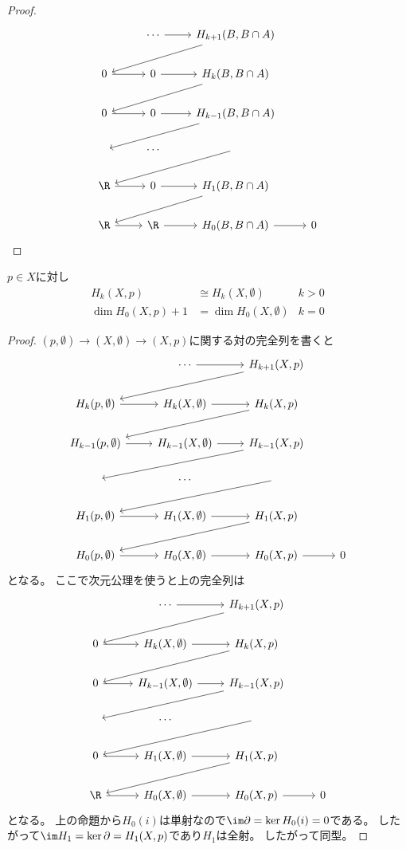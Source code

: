 \documentclass{jsarticle}
\begin{document}
\begin{proof}
\[
\begin{tikzcd}
~ &\cdots \ar[r] &H_{k+1}(B,B\cap A) \ar[dll]\\
0 \ar[r] &0 \ar[r] &H_k(B,B\cap A) \ar[dll]\\
0 \ar[r] &0 \ar[r] &H_{k-1}(B,B\cap A) \ar[dll]\\
~&\cdots&\ar[dll]\\
\R \ar[r] &0 \ar[r] &H_{1}(B,B\cap A) \ar[dll]\\
\R \ar[r] &\R \ar[r] &H_{0}(B,B\cap A) \ar[r]&0
\end{tikzcd}
\]
\end{proof}


\begin{prop}
$p\in X$に対し
\begin{align*}
H_k(X,p)&\cong H_k(X,\emptyset) &k>0\\
\dim H_0(X,p)+1&=\dim H_0(X,\emptyset)&k=0
\end{align*}
\end{prop}
\begin{proof}
$(p,\emptyset)\to (X,\emptyset)\to (X,p)$に関する対の完全列を書くと
\[
\begin{tikzcd}
~ &\cdots \ar[r] &H_{k+1}(X,p) \ar[dll]\\
H_k(p,\emptyset) \ar[r] &H_k(X,\emptyset) \ar[r] &H_k(X,p) \ar[dll]\\
H_{k-1}(p,\emptyset) \ar[r] &H_{k-1}(X,\emptyset) \ar[r] &H_{k-1}(X,p) \ar[dll]\\
~&\cdots&\ar[dll]\\
H_{1}(p,\emptyset) \ar[r] &H_{1}(X,\emptyset) \ar[r] &H_{1}(X,p) \ar[dll]\\
H_{0}(p,\emptyset) \ar[r] &H_{0}(X,\emptyset) \ar[r] &H_{0}(X,p) \ar[r]&0
\end{tikzcd}
\]
となる。
ここで次元公理を使うと上の完全列は
\[
\begin{tikzcd}
~ &\cdots \ar[r] &H_{k+1}(X,p) \ar[dll]\\
0 \ar[r] &H_k(X,\emptyset) \ar[r] &H_k(X,p) \ar[dll]\\
0 \ar[r] &H_{k-1}(X,\emptyset) \ar[r] &H_{k-1}(X,p) \ar[dll]\\
~&\cdots&\ar[dll]\\
0 \ar[r] &H_{1}(X,\emptyset) \ar[r] &H_{1}(X,p) \ar[dll]\\
\R \ar[r] &H_{0}(X,\emptyset) \ar[r] &H_{0}(X,p) \ar[r]&0
\end{tikzcd}
\]
となる。
上の命題から$H_0(i)$は単射なので$\im\partial=\ker H_0(i)=0$である。
したがって$\im H_1=\ker\partial=H_1(X,p)$であり$H_1$は全射。
したがって同型。
\end{proof}
\end{document}
